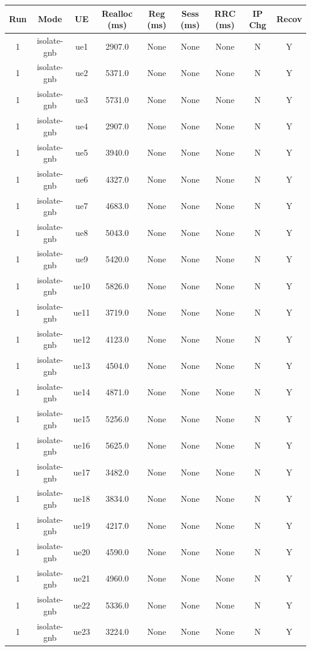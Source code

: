 \begin{table}[ht]
\centering
\begin{tabular}{|c|c|c|c|c|c|c|c|c|}
\hline
Run & Mode & UE & Realloc (ms) & Reg (ms) & Sess (ms) & RRC (ms) & IP Chg & Recov \\
\hline
1 & isolate-gnb & ue1 & 2907.0 & None & None & None & N & Y \\
1 & isolate-gnb & ue2 & 5371.0 & None & None & None & N & Y \\
1 & isolate-gnb & ue3 & 5731.0 & None & None & None & N & Y \\
1 & isolate-gnb & ue4 & 2907.0 & None & None & None & N & Y \\
1 & isolate-gnb & ue5 & 3940.0 & None & None & None & N & Y \\
1 & isolate-gnb & ue6 & 4327.0 & None & None & None & N & Y \\
1 & isolate-gnb & ue7 & 4683.0 & None & None & None & N & Y \\
1 & isolate-gnb & ue8 & 5043.0 & None & None & None & N & Y \\
1 & isolate-gnb & ue9 & 5420.0 & None & None & None & N & Y \\
1 & isolate-gnb & ue10 & 5826.0 & None & None & None & N & Y \\
1 & isolate-gnb & ue11 & 3719.0 & None & None & None & N & Y \\
1 & isolate-gnb & ue12 & 4123.0 & None & None & None & N & Y \\
1 & isolate-gnb & ue13 & 4504.0 & None & None & None & N & Y \\
1 & isolate-gnb & ue14 & 4871.0 & None & None & None & N & Y \\
1 & isolate-gnb & ue15 & 5256.0 & None & None & None & N & Y \\
1 & isolate-gnb & ue16 & 5625.0 & None & None & None & N & Y \\
1 & isolate-gnb & ue17 & 3482.0 & None & None & None & N & Y \\
1 & isolate-gnb & ue18 & 3834.0 & None & None & None & N & Y \\
1 & isolate-gnb & ue19 & 4217.0 & None & None & None & N & Y \\
1 & isolate-gnb & ue20 & 4590.0 & None & None & None & N & Y \\
1 & isolate-gnb & ue21 & 4960.0 & None & None & None & N & Y \\
1 & isolate-gnb & ue22 & 5336.0 & None & None & None & N & Y \\
1 & isolate-gnb & ue23 & 3224.0 & None & None & None & N & Y \\

\end{tabular}
\end{table}
